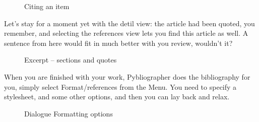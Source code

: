 \begin{figure}[h]
  
  \caption{Citing an item}
  \label{fig:searchx9}
\end{figure}

Let's stay for a moment yet with the detil view: the article had been
quoted, you remember, and selecting the references view lets you find
this article as well. A sentence from here would fit in much better
with you review, wouldn't it? 

\begin{figure}[h]
  
  \caption{Excerpt -- sections and quotes}
  \label{fig:searchxa}
\end{figure}

When you are finished with your work, Pybliographer does the
bibliography for you, simply select Format/references from the
Menu. You need to specify a stylesheet, and some other options, and
then you can lay back and relax.

\begin{figure}[h]
  
  \caption{Dialogue Formatting options}
  \label{fig:dlformat1}
\end{figure}



